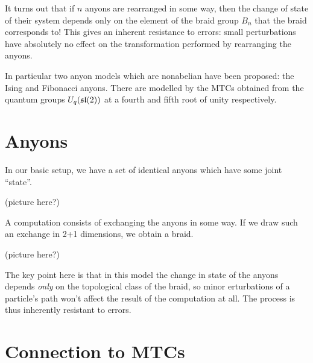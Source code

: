 It turns out that if $n$ anyons are rearranged in some way, then the change of
state of their system depends only on the element of the braid group $B_n$ that
the braid corresponds to! This gives an inherent resistance to errors: small
perturbations have absolutely no effect on the transformation performed by
rearranging the anyons.


In particular two anyon models which are nonabelian have been proposed: the
Ising and Fibonacci anyons. There are modelled by the MTCs obtained from the
quantum groups $U_q(\mathfrak{sl}(2))$ at a fourth and fifth root of unity respectively. 



\section{Anyons}
In our basic setup, we have a set of identical anyons which have some joint ``state''.


\begin{center}
    (picture here?)
\end{center}

A computation consists of exchanging the anyons in some way. If we draw such an
exchange in 2+1 dimensions, we obtain a braid. 

\begin{center}
    (picture here?)
\end{center}

The key point here is that in this model the change in state of the anyons
depends \emph{only} on the topological class of the braid, so minor
erturbations of a particle's path won't affect the result of the computation at
all. The process is thus inherently resistant to errors. 

\section{Connection to MTCs}

